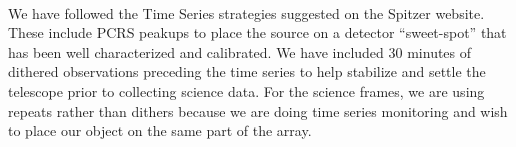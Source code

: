 \documentclass[letterpaper,12pt]{article}
\begin{document}
%
%
%

{}\\
We have followed the Time Series strategies suggested on the Spitzer website.
These include PCRS peakups to place the source on a detector ``sweet-spot'' that has been well characterized and calibrated.
We have included 30 minutes of dithered observations preceding the time series to help stabilize and settle the telescope prior to collecting science data.
For the science frames, we are using repeats rather than dithers because we are doing time series
monitoring and wish to place our object on the same part of the
array.
\end{document}
